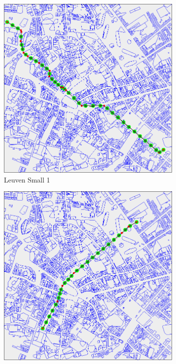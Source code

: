 \begin{figure}
	\begin{subfigure}[t]{0.46\textwidth}
        		\includegraphics[width=\textwidth]{img/leuven-small-1}
        		\caption{Leuven Small 1}
        		\label{fig:leuven-small-1}
	\end{subfigure}
	\hfil	
	\begin{subfigure}[t]{0.46\textwidth}
        		\includegraphics[width=\textwidth]{img/leuven-small-2}

\end{subfigure}
\end{figure}
